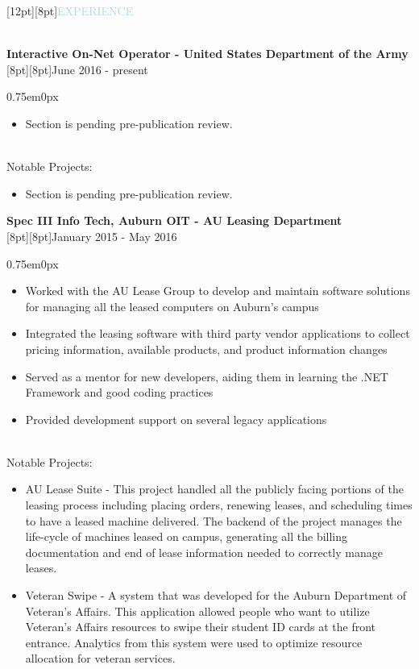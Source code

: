 \documentclass[12pt]{res}
\newenvironment{ResumeBlock}[1]
{
	\begin{large}
		\raisebox{0pt}[12pt][8pt]{\textcolor{lightblue}{#1}}
	\end{large}
	\\
}
{	
}
\newenvironment{DetailsBlock}[2]
{
	\textbf{\color{darkfont}#1}
	\\
	\raisebox{0pt}[8pt][8pt]{#2}
	\begin{adjustwidth}{0.75em}{0px}
}
{	
	\end{adjustwidth}
}
\begin{document}
	\begin{ResumeBlock}{EXPERIENCE}
		\begin{DetailsBlock}{Interactive On-Net Operator - United States Department of the Army}{June 2016 - present}
			\begin{itemize}
				\item Section is pending pre-publication review.
			\end{itemize}
			~\\
			Notable Projects:
			\begin{itemize}
				\item Section is pending pre-publication review.
			\end{itemize}
		\end{DetailsBlock}	
		\begin{DetailsBlock}{Spec III Info Tech, Auburn OIT - AU Leasing Department}{January 2015 - May 2016}
			\begin{itemize}
				\item Worked with the AU Lease Group to develop and maintain software solutions for managing all the leased computers on Auburn's campus
				\item Integrated the leasing software with third party vendor applications to collect pricing information, available products, and product information changes
                \item Served as a mentor for new developers, aiding them in learning the .NET Framework and good coding practices 
				\item Provided development support on several legacy applications
			\end{itemize}
			~\\
			Notable Projects:
			\begin{itemize}
				\item AU Lease Suite - This project handled all the publicly facing portions of the leasing process including placing orders, renewing leases, and scheduling times to have a leased machine delivered.  The backend of the project manages the life-cycle of machines leased on campus, generating all the billing documentation and end of lease information needed to correctly manage leases.    
                \item Veteran Swipe - A system that was developed for the Auburn Department of Veteran's Affairs.  This application allowed people who want to utilize Veteran's Affairs resources to swipe their student ID cards at the front entrance.  Analytics from this system were used to optimize resource allocation for veteran services.

\end{itemize}
\end{DetailsBlock}
\end{ResumeBlock}
\end{document}
